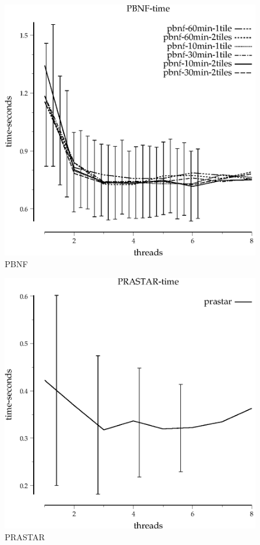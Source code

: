 \documentclass{article}
\begin{document}
\begin{figure}
\begin{center}
\includegraphics{PBNF-time}
\end{center}
\caption{PBNF}
\end{figure}

\begin{figure}
\begin{center}
\includegraphics{PRASTAR-time}
\end{center}
\caption{PRASTAR}
\end{figure}
\end{document}
